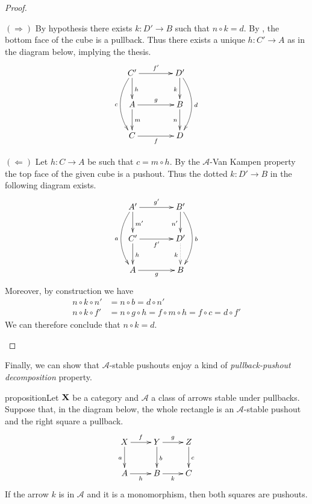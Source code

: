 \documentclass[a4paper,UKenglish,cleveref,pdftex, thm-restate,numberwithinsect]{lipics}
\def\X{\textbf {\textup{X}}}
\begin{document}
\begin{proof}
	\begin{proofEnd}		
		$(\Rightarrow)$ By hypothesis there exists $k:D'\to B$ such that $n\circ k = d$. By , the bottom face of the cube is a pullback. Thus there exists a unique $h:C'\to A$ as in the diagram below, implying the thesis.
		\[\xymatrix@C=40pt{C'  \ar[d]^{h}\ar[r]^{f'} \ar@/_.5cm/[dd]_{c}& D' \ar@/^.5cm/[dd]^{d}\ar[d]_{k}\\ A \ar[d]^{m} \ar[r]^{g} & B \ar[d]_{n} \\  C \ar[r]_f & D}\]
		
		\smallskip \noindent 
		$(\Leftarrow)$ Let $h:C\to A$ be such that $c=m\circ h$. By the $\mathcal{A}$-Van Kampen property the top face of the given cube is a pushout. Thus the dotted $k:D'\to B$ in the following diagram exists.
		\[\xymatrix@C=40pt{A' \ar@/_.5cm/[dd]_{a} \ar[d]^{m'} \ar[r]^{g'} & B' \ar[d]_{n'} \ar@/^.5cm/[dd]^{b} \\  C' \ar[d]^{h} \ar[r]_{f'} & D' \ar@{.>}[d]_{k}\\ A \ar[r]_g& B }\]
		Moreover, by construction we have
		\begin{align*}
	n\circ k \circ n'&= n\circ b=d\circ n'\\
		n\circ k \circ f' &= n\circ g\circ h=f\circ m\circ h=f\circ c= d\circ f' 
		\end{align*}
		We can therefore conclude that $n\circ k =d$.
	\end{proofEnd} \qedhere 
\end{proof}

Finally, we can show that $\mathcal{A}$-stable pushouts enjoy a kind of \emph{pullback-pushout decomposition} property.

\begin{theoremEnd}[category=sec2]{proposition}\label{prop:stab}Let $\X$ be a category and $\mathcal{A}$ a class of arrows stable under pullbacks. Suppose that, in the diagram below, the whole rectangle is an $\mathcal{A}$-stable pushout and the right square a pullback.
	\[\xymatrix{X \ar[d]_{a} \ar[r]^{f}& \ar[r]^{g} Y \ar[d]^{b}& Z \ar[d]^{c}\\ A \ar[r]_{h}& B \ar[r]_{k}& C}\]
	If the arrow $k$ is in $\mathcal{A}$ and it is a monomorphism,  then both squares are pushouts.
\end{theoremEnd}
\end{document}
